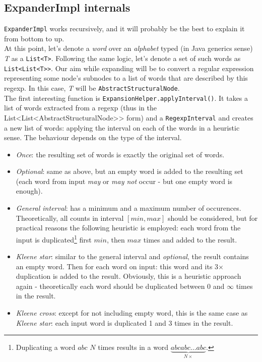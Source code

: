 \documentclass[a4paper,10pt,oneside]{article}
\newcommand{\code}[1]{\texttt{#1}}
\begin{document}
\subsection{ExpanderImpl internals}

\code{ExpanderImpl} works recursively, and it will probably be the best to explain it from bottom to up.\\

At this point, let's denote a \emph{word} over an \emph{alphabet} typed (in Java generics sense) \emph{T} as a \code{List<T>}. Following the same logic, let's denote a set of such words as \code{List<List<T>{}>}. Our aim while expanding will be to convert a regular expression representing some node's subnodes to a list of words that are described by this regexp. In this case, \emph{T} will be \code{AbstractStructuralNode}.\\

The first interesting function is \code{ExpansionHelper.applyInterval()}. It takes a list of words extracted from a regexp (thus in the List<List<AbstractStructuralNode>{}> form) and a \code{RegexpInterval} and creates a new list of words: applying the interval on each of the words in a heuristic sense. The behaviour depends on the type of the interval.
\begin{itemize}
	\item \emph{Once}: the resulting set of words is exactly the original set of words.
	\item \emph{Optional}: same as above, but an empty word is added to the resulting set (each word from input \emph{may} or \emph{may not} occur - but one empty word is enough).
	\item \emph{General interval}: has a minimum and a maximum number of occurences. Theoretically, all counts in interval $ [min, max] $ should be considered, but for practical reasons the following heuristic is employed: each word from the input is duplicated\footnote{Duplicating a word $abc$ $N$ times results in a word $\underbrace{abcabc\ldots abc}_{N\times}$.} first $min$, then $max$ times and added to the result.
	\item \emph{Kleene star}: similar to the general interval and \emph{optional}, the result contains an empty word. Then for each word on input: this word and its 3$\times$ duplication is added to the result. Obviously, this is a heuristic approach again - theoretically each word should be duplicated between 0 and $\infty$ times in the result.
	\item \emph{Kleene cross}: except for not including empty word, this is the same case as \emph{Kleene star}: each input word is duplicated 1 and 3 times in the result.
\end{itemize}
\end{document}
